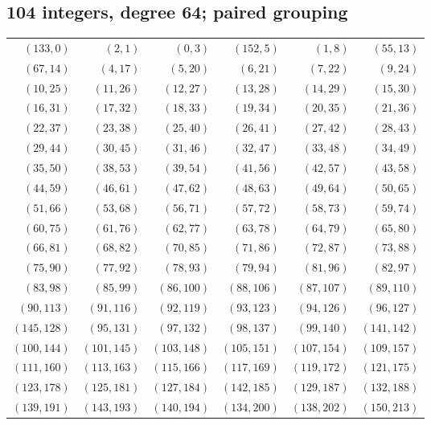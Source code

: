 \subsection*{104 integers, degree 64; paired grouping}
\begingroup\small
\begin{longtable}{rrrrrr}
$(133,0)$ & $(2,1)$ & $(0,3)$ & $(152,5)$ & $(1,8)$ & $(55,13)$\\
$(67,14)$ & $(4,17)$ & $(5,20)$ & $(6,21)$ & $(7,22)$ & $(9,24)$\\
$(10,25)$ & $(11,26)$ & $(12,27)$ & $(13,28)$ & $(14,29)$ & $(15,30)$\\
$(16,31)$ & $(17,32)$ & $(18,33)$ & $(19,34)$ & $(20,35)$ & $(21,36)$\\
$(22,37)$ & $(23,38)$ & $(25,40)$ & $(26,41)$ & $(27,42)$ & $(28,43)$\\
$(29,44)$ & $(30,45)$ & $(31,46)$ & $(32,47)$ & $(33,48)$ & $(34,49)$\\
$(35,50)$ & $(38,53)$ & $(39,54)$ & $(41,56)$ & $(42,57)$ & $(43,58)$\\
$(44,59)$ & $(46,61)$ & $(47,62)$ & $(48,63)$ & $(49,64)$ & $(50,65)$\\
$(51,66)$ & $(53,68)$ & $(56,71)$ & $(57,72)$ & $(58,73)$ & $(59,74)$\\
$(60,75)$ & $(61,76)$ & $(62,77)$ & $(63,78)$ & $(64,79)$ & $(65,80)$\\
$(66,81)$ & $(68,82)$ & $(70,85)$ & $(71,86)$ & $(72,87)$ & $(73,88)$\\
$(75,90)$ & $(77,92)$ & $(78,93)$ & $(79,94)$ & $(81,96)$ & $(82,97)$\\
$(83,98)$ & $(85,99)$ & $(86,100)$ & $(88,106)$ & $(87,107)$ & $(89,110)$\\
$(90,113)$ & $(91,116)$ & $(92,119)$ & $(93,123)$ & $(94,126)$ & $(96,127)$\\
$(145,128)$ & $(95,131)$ & $(97,132)$ & $(98,137)$ & $(99,140)$ & $(141,142)$\\
$(100,144)$ & $(101,145)$ & $(103,148)$ & $(105,151)$ & $(107,154)$ & $(109,157)$\\
$(111,160)$ & $(113,163)$ & $(115,166)$ & $(117,169)$ & $(119,172)$ & $(121,175)$\\
$(123,178)$ & $(125,181)$ & $(127,184)$ & $(142,185)$ & $(129,187)$ & $(132,188)$\\
$(139,191)$ & $(143,193)$ & $(140,194)$ & $(134,200)$ & $(138,202)$ & $(150,213)$\\
\end{longtable}
\endgroup
